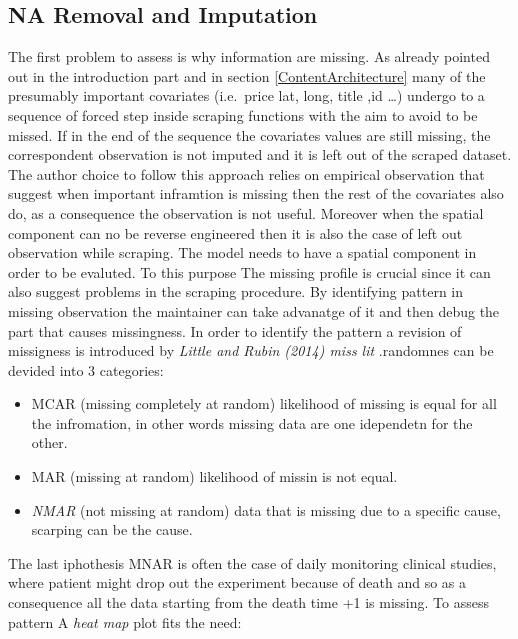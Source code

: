 \documentclass[
  12pt,
  a4paper,
  oneside]{book}
\providecommand{\tightlist}{%
  \setlength{\itemsep}{0pt}\setlength{\parskip}{0pt}}
\theoremstyle{definition}
\theoremstyle{definition}
\theoremstyle{definition}
\theoremstyle{remark}
\begin{document}
\hypertarget{na-removal-and-imputation}{%
\subsection{NA Removal and Imputation}\label{na-removal-and-imputation}}

The first problem to assess is why information are missing. As already pointed out in the introduction part and in section \ref{ContentArchitecture} many of the presumably important covariates (i.e.~price lat, long, title ,id \ldots) undergo to a sequence of forced step inside scraping functions with the aim to avoid to be missed. If in the end of the sequence the covariates values are still missing, the correspondent observation is not imputed and it is left out of the scraped dataset. The author choice to follow this approach relies on empirical observation that suggest when important inframtion is missing then the rest of the covariates also do, as a consequence the observation is not useful. Moreover when the spatial component can no be reverse engineered then it is also the case of left out observation while scraping. The model needs to have a spatial component in order to be evaluted. To this purpose The missing profile is crucial since it can also suggest problems in the scraping procedure. By identifying pattern in missing observation the maintainer can take advanatge of it and then debug the part that causes missingness. In order to identify the pattern a revision of missigness is introduced by \emph{Little and Rubin (2014) miss lit} .randomnes can be devided into 3 categories:

\begin{itemize}
\tightlist
\item
  MCAR (missing completely at random) likelihood of missing is equal for all the infromation, in other words missing data are one idependetn for the other.
\item
  MAR (missing at random) likelihood of missin is not equal.
\item
  \emph{NMAR} (not missing at random) data that is missing due to a specific cause, scarping can be the cause.
\end{itemize}

The last iphothesis MNAR is often the case of daily monitoring clinical studies, where patient might drop out the experiment because of death and so as a consequence all the data starting from the death time +1 is missing.
To assess pattern A \emph{heat map} plot fits the need:
\end{document}
